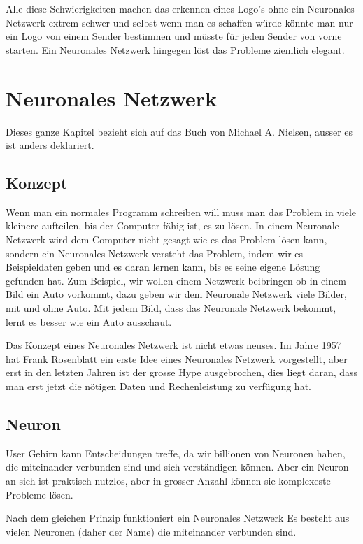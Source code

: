 \documentclass[12pt,a4paper]{report}
\begin{document}
Alle diese Schwierigkeiten machen das erkennen eines Logo's ohne ein Neuronales Netzwerk extrem schwer und selbst
wenn man es schaffen würde könnte man nur ein Logo von einem Sender bestimmen und müsste für jeden Sender von vorne starten.
Ein Neuronales Netzwerk hingegen löst das Probleme ziemlich elegant.

\chapter{Neuronales Netzwerk}
\label{ch:neuronalesNetzwerk}
Dieses ganze Kapitel bezieht sich auf das Buch von Michael A. Nielsen\cite{neuralbook}, ausser es ist anders deklariert.
\section{Konzept}\label{sec:konzept}
Wenn man ein normales Programm schreiben will muss man das Problem in viele kleinere aufteilen, bis der Computer fähig ist,
es zu lösen.
In einem Neuronale Netzwerk wird dem Computer nicht gesagt wie es das Problem lösen kann, sondern ein Neuronales Netzwerk
versteht das Problem, indem wir es Beispieldaten geben und es daran lernen kann, bis es seine eigene Lösung gefunden hat.
Zum Beispiel, wir wollen einem Netzwerk beibringen ob in einem Bild ein Auto vorkommt,
dazu geben wir dem Neuronale Netzwerk viele Bilder, mit und ohne Auto.
Mit jedem Bild, dass das Neuronale Netzwerk bekommt, lernt es besser wie ein Auto ausschaut.

Das Konzept eines Neuronales Netzwerk ist nicht etwas neuses.
Im Jahre 1957 hat Frank Rosenblatt ein erste Idee eines Neuronales Netzwerk vorgestellt, aber erst in den letzten
Jahren ist der grosse Hype ausgebrochen, dies liegt daran, dass man erst jetzt die nötigen Daten
und Rechenleistung zu verfügung hat.

\section{Neuron}\label{sec:neuron}
User Gehirn kann Entscheidungen treffe, da wir billionen von Neuronen haben, die miteinander verbunden sind und sich
verständigen können.
Aber ein Neuron an sich ist praktisch nutzlos, aber in grosser Anzahl können sie komplexeste Probleme lösen.

Nach dem gleichen Prinzip funktioniert ein Neuronales Netzwerk
Es besteht aus vielen Neuronen (daher der Name) die miteinander verbunden sind.
\end{document}
